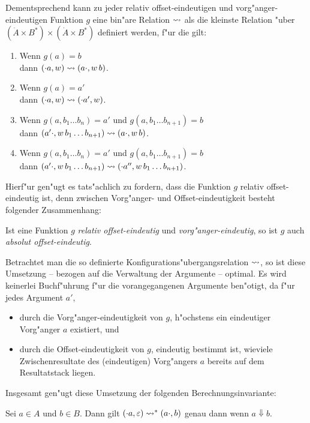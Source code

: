 \documentclass[12pt,a4paper]{article}
\begin{document}
Dementsprechend kann zu jeder relativ offset-eindeutigen und vorg"anger-eindeutigen Funktion
$g$ eine bin"are Relation $\rightsquigarrow$ als die kleinste Relation "uber
$(\dot{A} \times B^*) \times (\dot{A} \times B^*)$ definiert werden, f"ur die gilt:
\begin{enumerate}
\item Wenn $g(a) = b$ \\
  dann $(\cdot a,w) \rightsquigarrow (a \cdot,w\,b)$.
\item Wenn $g(a) = a'$ \\
  dann $(\cdot a,w) \rightsquigarrow (\cdot a',w)$.
\item Wenn $g(a,b_1 \ldots b_n) = a'$ und $g(a,b_1 \ldots b_{n+1})=b$ \\
  dann $(a' \cdot,w\,b_1 \ldots b_{n+1}) \rightsquigarrow (a \cdot,w\,b)$.
\item Wenn $g(a,b_1 \ldots b_n) = a'$ und $g(a,b_1 \ldots b_{n+1})=b$ \\
  dann $(a' \cdot,w\,b_1 \ldots b_{n+1}) \rightsquigarrow (\cdot a'',w\,b_1 \ldots b_{n+1})$.
\end{enumerate}
Hierf"ur gen"ugt es tats"achlich zu fordern, dass die Funktion $g$ relativ offset-eindeutig ist, denn
zwischen Vorg"anger- und Offset-eindeutigkeit besteht folgender Zusammenhang:

\begin{lemma}
  Ist eine Funktion $g$ \emph{relativ offset-eindeutig} und \emph{vorg"anger-eindeutig},
  so ist $g$ auch \emph{absolut offset-eindeutig}.
\end{lemma}

Betrachtet man die so definierte Konfigurations"ubergangsrelation $\rightsquigarrow$, so ist diese Umsetzung
-- bezogen auf die Verwaltung der Argumente -- optimal. Es wird keinerlei Buchf"uhrung f"ur die
vorangegangenen Argumente ben"otigt, da f"ur jedes Argument $a'$,
\begin{itemize}
\item durch die Vorg"anger-eindeutigkeit von $g$, h"ochstens ein eindeutiger Vorg"anger $a$ existiert, und
\item durch die Offset-eindeutigkeit von $g$, eindeutig bestimmt ist, wieviele Zwischenresultate des
  (eindeutigen) Vorg"angers $a$ bereits auf dem Resultatstack liegen.
\end{itemize}
Insgesamt gen"ugt diese Umsetzung der folgenden Berechnungsinvariante:
\begin{lemma}
  Sei $a \in A$ und $b \in B$. Dann gilt
  $(\cdot a,\varepsilon) \rightsquigarrow^* (a \cdot, b)$
  genau dann wenn $a \Downarrow b$.
\end{lemma}
\end{document}
